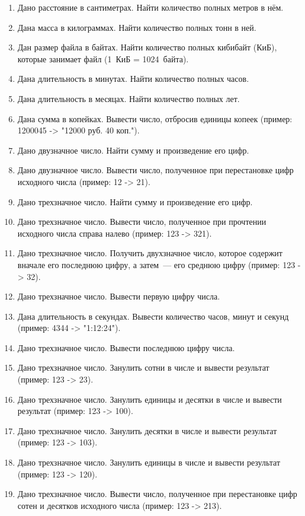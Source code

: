 \documentclass[main.tex]{subfiles}
\begin{document}
\begin{enumerate}
    \item Дано расстояние в сантиметрах. Найти количество полных метров в нём.%
    \item Дана масса в килограммах. Найти количество полных тонн в ней.%
    \item Дан размер файла в байтах. Найти количество полных кибибайт (КиБ), которые занимает файл (1~КиБ = 1024~байта).
    \item Дана длительность в минутах. Найти количество полных часов.%
    \item Дана длительность в месяцах. Найти количество полных лет.%
    \item Дана сумма в копейках. Вывести число, отбросив единицы копеек (пример: 1200045 -> "12000 руб. 40 коп.").
    \item Дано двузначное число. Найти сумму и произведение его цифр.
    \item Дано двузначное число. Вывести число, полученное при перестановке цифр исходного числа (пример: 12 -> 21).
    \item Дано трехзначное число. Найти сумму и произведение его цифр.
    \item Дано трехзначное число. Вывести число, полученное при прочтении исходного числа справа налево (пример: 123 -> 321).
    \item Дано трехзначное число. Получить двухзначное число, которое содержит вначале его последнюю цифру, а затем~--- его среднюю цифру (пример: 123 -> 32).
    \item Дано трехзначное число. Вывести первую цифру числа.
    \item Дана длительность в секундах. Вывести количество часов, минут и секунд (пример: 4344 -> "1:12:24").
    \item Дано трехзначное число. Вывести последнюю цифру числа.
    \item Дано трехзначное число. Занулить сотни в числе и вывести результат (пример: 123 -> 23).
    \item Дано трехзначное число. Занулить единицы и десятки в числе и вывести результат (пример: 123 -> 100).
    \item Дано трехзначное число. Занулить десятки в числе и вывести результат (пример: 123 -> 103).
    \item Дано трехзначное число. Занулить единицы в числе и вывести результат (пример: 123 -> 120).
    \item Дано трехзначное число. Вывести число, полученное при перестановке цифр сотен и десятков исходного числа (пример: 123 -> 213).

\end{enumerate}
\end{document}
